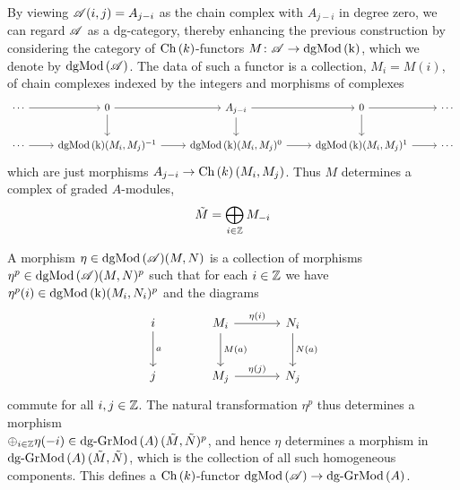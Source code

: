 \documentclass[dissertation.tex]{subfiles}
\begin{document}
By viewing $\mathscr{A}(i,j) = A_{j - i}$ as the chain complex with $A_{j - i}$ in degree zero, we can regard $\mathscr{A}$ as a dg-category, thereby enhancing the previous construction by considering the category of $\operatorname{Ch}\left(k\right)$-functors $M \colon \mathscr{A} \to \operatorname{dgMod\left(k\right)}$, which we denote by $\operatorname{dgMod\left(\mathscr{A}\right)}$.
The data of such a functor is a collection, $M_i = M(i)$, of chain complexes indexed by the integers and morphisms of complexes
$$\begin{tikzcd}
  \cdots \arrow{r} & 0 \arrow{r}\arrow{d} & A_{j-i}\arrow{d} \arrow{r} & 0\arrow{r}\arrow{d} & \cdots\\
  \cdots \arrow{r} & \cdg{k}(M_i,M_j)^{-1} \arrow{r} & \cdg{k}(M_i,M_j)^0 \arrow{r} & \cdg{k}(M_i,M_j)^1 \arrow{r} & \cdots
\end{tikzcd}$$
which are just morphisms $A_{j-i} \to \operatorname{Ch}\left(k\right)(M_i,M_j)$.
Thus $M$ determines a complex of graded $A$-modules,
$$\tilde{M} = \bigoplus_{i \in \mathbb{Z}} M_{-i}$$

A morphism $\eta \in \operatorname{dgMod\left(\mathscr{A}\right)}(M, N)$ is a collection of morphisms $\eta^p \in \operatorname{dgMod\left(\mathscr{A}\right)}(M, N)^p$ such that for each $i \in \mathbb{Z}$ we have $\eta^p(i) \in \operatorname{dgMod\left(k\right)}(M_i, N_i)^p$ and the diagrams
$$\begin{tikzcd}[sep=large]
  i \arrow{d}{a} & M_i \arrow{r}{\eta(i)}\arrow{d}{M(a)} & N_i \arrow{d}{N(a)}\\
  j & M_j \arrow{r}{\eta(j)} & N_j
\end{tikzcd}$$
commute for all $i,j \in \mathbb{Z}$.
The natural transformation $\eta^p$ thus determines a morphism \\$\oplus_{i \in \mathbb{Z}} \eta(-i) \in \operatorname{dg-GrMod}\left(A\right)(\tilde{M}, \tilde{N})^p$, and hence $\eta$ determines a morphism in $\operatorname{dg-GrMod}\left(A\right)(\tilde{M}, \tilde{N})$, which is the collection of all such homogeneous components.
This defines a $\operatorname{Ch}\left(k\right)$-functor $\operatorname{dgMod\left(\mathscr{A}\right)} \to \operatorname{dg-GrMod}\left(A\right)$.
\end{document}
